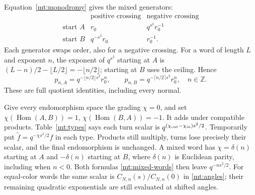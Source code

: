 \documentclass[11pt]{article}
\numberwithin{equation}{section}
\theoremstyle{definition}\newtheorem{definition}[theorem]{Definition}
\theoremstyle{remark}\newtheorem{remark}[theorem]{Remark}
\newcommand{\Hom}{\operatorname{Hom}}
\begin{document}
Equation~\eqref{mt:monodromy} gives the mixed generators:
\[
\begin{array}{c|cc}
 &\text{positive crossing}&\text{negative crossing}\\\hline
 \text{start }A&r_0&q^{s^2}r_0^{-1}\\
 \text{start }B&q^{-s^2}r_0&r_0^{-1}.
\end{array}
\]
Each generator swaps order, also for a negative crossing. For a
word of length $L$ and exponent $n$, the exponent of $q^{s^2}$
starting at $A$ is $(L-n)/2-\lfloor L/2\rfloor
=-\lfloor n/2\rfloor$; starting at $B$ uses the ceiling. Hence
\begin{equation}\label{mt:mixed-words}
 p_{n,A}=q^{-\lfloor n/2\rfloor s^2}r_0^n,\qquad
 p_{n,B}=q^{-\lceil n/2\rceil s^2}r_0^n,
 \quad n\in\mathbb Z.
\end{equation}
These are full quotient identities, including every normal.

Give every endomorphism space the grading $\chi=0$, and set
$\chi(\Hom(A,B))=1$, $\chi(\Hom(B,A))=-1$.
It adds under compatible products. Table~\ref{mt:types} says each
turn scalar is $q^{(\chi_{\rm out}-\chi_{\rm in})s^2/2}$.
Temporarily put $\widetilde f=q^{-\chi s^2/2}f$ in each type.
Products still multiply, turns lose precisely their scalar, and
the final endomorphism is unchanged. A mixed word has
$\chi=\delta(n)$ starting at $A$ and $-\delta(n)$ starting at $B$,
where $\delta(n)$ is Euclidean parity, including when $n<0$.
Both formulas \eqref{mt:mixed-words} then leave $q^{-ns^2/2}$.
For equal-color words the same scalar is
$C_{N,n}(s)/C_{N,n}(0)$ in \eqref{mt:angles}; their remaining
quadratic exponentials are still evaluated at shifted angles.
\end{document}
